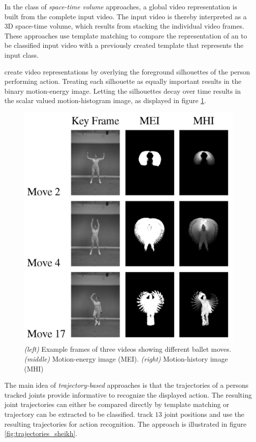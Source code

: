 In the class of \textit{space-time volume} approaches, a global video representation is built from the complete input video.
The input video is thereby interpreted as a 3D space-time volume, which results from stacking the individual video frames.
These approaches use template matching to compare the representation of an to be classified input video with a previously created template that represents the input class.
 
\textcite{bobick_recognition_2001} create video representations by overlying the foreground silhouettes of the person performing action.
Treating each silhouette as equally important results in the binary motion-energy image.
Letting the silhouettes decay over time results in the scalar valued motion-histogram image, as displayed in figure \ref{fig:spacetimevolumes_meimhi}.

\begin{figure}[H]
    \centering
    \includegraphics[width=.45\textwidth]{img_related/spacetimevolumes_meimhi}
    \caption{\textit{(left)} Example frames of three videos showing different ballet moves. \textit{(middle)} Motion-energy image (MEI). \textit{(right)} Motion-history image (MHI) \cite{bobick_recognition_2001}}
    \label{fig:spacetimevolumes_meimhi}
\end{figure}

The main idea of \textit{trajectory-based} approaches is that the trajectories of a persons tracked joints provide informative to recognize the displayed action.
The resulting joint trajectories can either be compared directly by template matching or trajectory can be extracted to be classified.
\textcite{sheikh_exploring_2005} track $13$ joint positions and use the resulting trajectories for action recognition.
The approach is illustrated in figure \ref{fig:trajectories_sheikh}.

